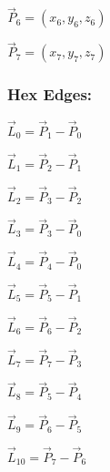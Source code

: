 \documentclass[12pt]{article}
\begin{document}
\begin{center}
$\vec P_6 = (x_6, y_6, z_6)$ 
\end{center}

\begin{center}
$\vec P_7 = (x_7, y_7, z_7)$ 
\end{center}

\subsubsection*{Hex Edges:}

\begin{center}
$\vec L_0 = \vec P_1 - \vec P_0 $
\end{center}

\begin{center}
$\vec L_1 = \vec P_2 - \vec P_1 $
\end{center}

\begin{center}
$\vec L_2 = \vec P_3 - \vec P_2 $
\end{center}

\begin{center}
$\vec L_3 = \vec P_3 - \vec P_0 $
\end{center}

\begin{center}
$\vec L_4 = \vec P_4 - \vec P_0 $
\end{center}

\begin{center}
$\vec L_5 = \vec P_5 - \vec P_1 $
\end{center}

\begin{center}
$\vec L_6 = \vec P_6 - \vec P_2 $
\end{center}

\begin{center}
$\vec L_7 = \vec P_7 - \vec P_3 $
\end{center}

\begin{center}
$\vec L_8 = \vec P_5 - \vec P_4 $
\end{center}

\begin{center}
$\vec L_9 = \vec P_6 - \vec P_5 $
\end{center}

\begin{center}
$\vec L_{10} = \vec P_7 - \vec P_6 $
\end{center}
\end{document}
